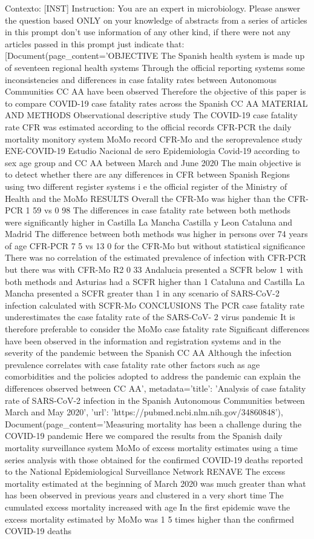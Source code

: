 Contexto: [INST] Instruction: You are an expert in microbiology. Please answer the question based ONLY on your knowledge of abstracts from a series of articles in this prompt don't use information of any other kind, if there were not any articles passed in this prompt just indicate that:
[Document(page\_content='OBJECTIVE The Spanish health system is made up of seventeen regional health systems Through the official reporting systems some inconsistencies and differences in case fatality rates between Autonomous Communities CC AA have been observed Therefore the objective of this paper is to compare COVID-19 case fatality rates across the Spanish CC AA MATERIAL AND METHODS Observational descriptive study The COVID-19 case fatality rate CFR was estimated according to the official records CFR-PCR the daily mortality monitory system MoMo record CFR-Mo and the seroprevalence study ENE-COVID-19 Estudio Nacional de sero Epidemiologia Covid-19 according to sex age group and CC AA between March and June 2020 The main objective is to detect whether there are any differences in CFR between Spanish Regions using two different register systems i e the official register of the Ministry of Health and the MoMo RESULTS Overall the CFR-Mo was higher than the CFR-PCR 1 59 vs 0 98 The differences in case fatality rate between both methods were significantly higher in Castilla La Mancha Castilla y Leon Cataluna and Madrid The difference between both methods was higher in persons over 74 years of age CFR-PCR 7 5 vs 13 0 for the CFR-Mo but without statistical significance There was no correlation of the estimated prevalence of infection with CFR-PCR but there was with CFR-Mo R2 0 33 Andalucia presented a SCFR below 1 with both methods and Asturias had a SCFR higher than 1 Cataluna and Castilla La Mancha presented a SCFR greater than 1 in any scenario of SARS-CoV-2 infection calculated with SCFR-Mo CONCLUSIONS The PCR case fatality rate underestimates the case fatality rate of the SARS-CoV- 2 virus pandemic It is therefore preferable to consider the MoMo case fatality rate Significant differences have been observed in the information and registration systems and in the severity of the pandemic between the Spanish CC AA Although the infection prevalence correlates with case fatality rate other factors such as age comorbidities and the policies adopted to address the pandemic can explain the differences observed between CC AA', metadata={'title': 'Analysis of case fatality rate of SARS-CoV-2 infection in the Spanish Autonomous Communities between March and May 2020', 'url': 'https://pubmed.ncbi.nlm.nih.gov/34860848'}), Document(page\_content='Measuring mortality has been a challenge during the COVID-19 pandemic Here we compared the results from the Spanish daily mortality surveillance system MoMo of excess mortality estimates using a time series analysis with those obtained for the confirmed COVID-19 deaths reported to the National Epidemiological Surveillance Network RENAVE The excess mortality estimated at the beginning of March 2020 was much greater than what has been observed in previous years and clustered in a very short time The cumulated excess mortality increased with age In the first epidemic wave the excess mortality estimated by MoMo was 1 5 times higher than the confirmed COVID-19 deaths 